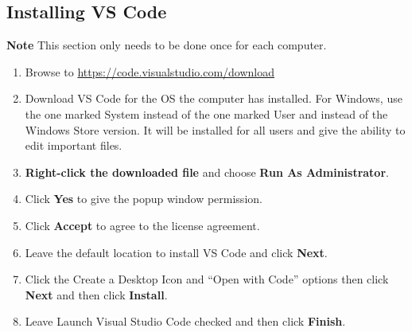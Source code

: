 \documentclass{article}
\begin{document}
\subsection*{Installing VS Code}
\textbf{Note} This section only needs to be done once for each computer.
\begin{enumerate}
    \item Browse to \url{https://code.visualstudio.com/download}
    \item Download VS Code for the OS the computer has installed. For Windows,
    use the one marked System instead of the one marked User and instead of the
    Windows Store version. It will be installed for all users and give the 
    ability to edit important files.  
    \item \textbf{Right-click the downloaded file} and choose 
    \textbf{Run As Administrator}.
    \item Click \textbf{Yes} to give the popup window permission.
    \item Click \textbf{Accept} to agree to the license agreement.
    \item Leave the default location to install VS Code and click 
    \textbf{Next}.
    \item Click the Create a Desktop Icon and “Open with Code” options then 
    click \textbf{Next} and then click \textbf{Install}.
    \item Leave Launch Visual Studio Code checked and then click 
    \textbf{Finish}.
\end{enumerate}
\newpage
\end{document}
